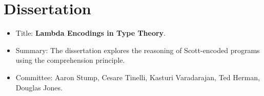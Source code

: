 \documentclass{article}
\begin{document}
  
  

\section*{Dissertation}
\begin{itemize}
\item Title: \textbf{Lambda Encodings in Type Theory}.  

\item Summary: The dissertation explores the reasoning
  of Scott-encoded programs using the comprehension principle.
   
\item Committee: Aaron Stump, Cesare Tinelli, Kasturi Varadarajan, Ted Herman, Douglas Jones.
     
\end{itemize}
\end{document}
